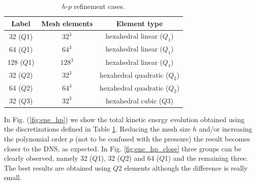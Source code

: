 \begin{table}[h]
\centering
\begin{tabular}{ccc}
\toprule
Label&Mesh elements&Element type\\
\midrule
\midrule
32 ($Q$1)&$32^3$&hexahedral linear ($Q_1$)\\
64 ($Q$1)&$64^3$&hexahedral linear ($Q_1$)\\
128 ($Q$1)&$128^3$&hexahedral linear ($Q_1$)\\
32 ($Q$2)&$32^3$&hexahedral quadratic ($Q_2$)\\
64 ($Q$2)&$64^3$&hexahedral quadratic ($Q_2$)\\
32 ($Q$3)&$32^3$&hexahedral cubic ($Q3$)\\
\bottomrule
\end{tabular}
\caption{$h$-$p$ refinement cases.}
\label{table:refinement}
\end{table}


In Fig. (\ref{fig:ene_hp}) we show the total kinetic energy evolution obtained using the discretizations defined in Table \ref{table:refinement}. Reducing the mesh size $h$ and/or increasing the polynomial order $p$ (not to be confused with the pressure) the result becomes closer to the DNS, as expected. In Fig. \ref{fig:ene_hp_close} three groups can be clearly observed, namely 32 ($Q$1), 32 ($Q$2) and 64 ($Q$1) and the remaining three. The best results are obtained using $Q$2 elements although the difference is really small.

